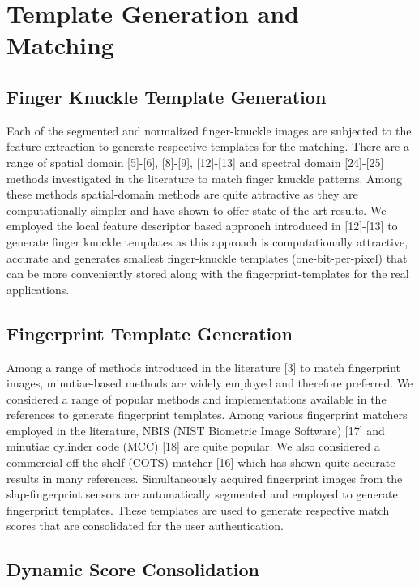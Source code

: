\section{Template Generation and Matching}

\subsection{Finger Knuckle Template Generation}

Each of the segmented and normalized finger-knuckle images are subjected to the feature extraction to generate respective templates for the matching. There are a range of spatial domain [5]-[6], [8]-[9], [12]-[13] and spectral domain [24]-[25] methods investigated in the literature to match finger knuckle patterns. Among these methods spatial-domain methods are quite attractive as they are computationally simpler and have shown to offer state of the art results.  We employed the local feature descriptor based approach introduced in [12]-[13] to generate finger knuckle templates as this approach is computationally attractive, accurate and generates smallest finger-knuckle templates (one-bit-per-pixel) that can be more conveniently stored along with the fingerprint-templates for the real applications. 

\subsection{Fingerprint Template Generation}

Among a range of methods introduced in the literature [3] to match fingerprint images, minutiae-based methods are widely employed and therefore preferred. We considered a range of popular methods and implementations available in the references to generate fingerprint templates. Among various fingerprint matchers employed in the literature, NBIS (NIST Biometric Image Software) [17] and minutiae cylinder code (MCC) [18] are quite popular. We also considered a commercial off-the-shelf (COTS) matcher [16] which has shown quite accurate results in many references. Simultaneously acquired fingerprint images from the slap-fingerprint sensors are automatically segmented and employed to generate fingerprint templates. These templates are used to generate respective match scores that are consolidated for the user authentication. 

\subsection{Dynamic Score Consolidation}

